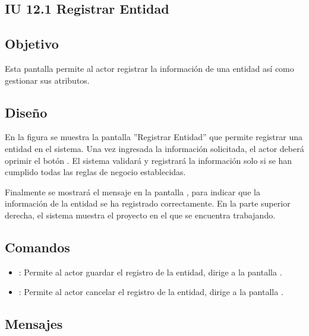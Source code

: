 \subsection{IU 12.1 Registrar Entidad}

\subsection{Objetivo}
	Esta pantalla permite al actor registrar la información de una entidad así como gestionar sus atributos.
\subsection{Diseño}
	En la figura  se muestra la pantalla ''Registrar Entidad'' que permite registrar una entidad en el sistema.
	Una vez ingresada la información solicitada, el actor deberá oprimir el botón  . El sistema validará y registrará la información solo si se han cumplido todas las reglas de negocio establecidas.
	
	Finalmente se mostrará el mensaje  en la pantalla , para indicar que la información de la entidad se ha registrado correctamente.
	En la parte superior derecha, el sistema muestra el proyecto en el que se encuentra trabajando.

\subsection{Comandos}
\begin{itemize}
	\item {}: Permite al actor guardar el registro de la entidad, dirige a la pantalla .
	\item {}: Permite al actor cancelar el registro de la entidad, dirige a la pantalla .
\end{itemize}

\subsection{Mensajes}

